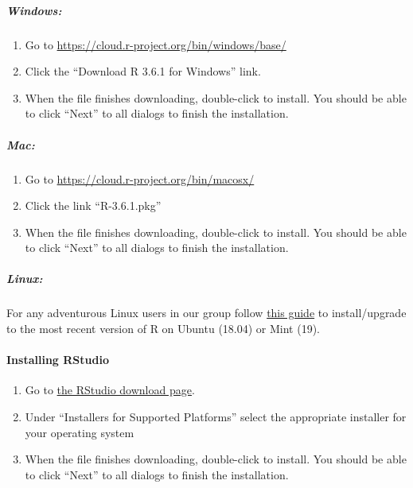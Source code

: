 \documentclass[]{article}
\providecommand{\tightlist}{%
  \setlength{\itemsep}{0pt}\setlength{\parskip}{0pt}}
\let\oldparagraph\paragraph
\renewcommand{\paragraph}[1]{\oldparagraph{#1}\mbox{}}
\let\oldsubparagraph\subparagraph
\renewcommand{\subparagraph}[1]{\oldsubparagraph{#1}\mbox{}}
\begin{document}
\hypertarget{windows}{%
\subparagraph{Windows:}\label{windows}}

\begin{enumerate}
\def\labelenumi{\arabic{enumi}.}
\tightlist
\item
  Go to \url{https://cloud.r-project.org/bin/windows/base/}
\item
  Click the ``Download R 3.6.1 for Windows'' link.
\item
  When the file finishes downloading, double-click to install. You
  should be able to click ``Next'' to all dialogs to finish the
  installation.
\end{enumerate}

\hypertarget{mac}{%
\subparagraph{Mac:}\label{mac}}

\begin{enumerate}
\def\labelenumi{\arabic{enumi}.}
\tightlist
\item
  Go to \url{https://cloud.r-project.org/bin/macosx/}
\item
  Click the link ``R-3.6.1.pkg''
\item
  When the file finishes downloading, double-click to install. You
  should be able to click ``Next'' to all dialogs to finish the
  installation.
\end{enumerate}

\hypertarget{linux}{%
\subparagraph{Linux:}\label{linux}}

For any adventurous Linux users in our group follow
\href{https://github.com/duckmayr/install-update-r-on-linux}{this guide}
to install/upgrade to the most recent version of R on Ubuntu (18.04) or
Mint (19).

\hypertarget{installing-rstudio}{%
\paragraph{Installing RStudio}\label{installing-rstudio}}

\begin{enumerate}
\def\labelenumi{\arabic{enumi}.}
\tightlist
\item
  Go to
  \href{https://www.rstudio.com/products/rstudio/download/\#download}{the
  RStudio download page}.
\item
  Under ``Installers for Supported Platforms'' select the appropriate
  installer for your operating system
\item
  When the file finishes downloading, double-click to install. You
  should be able to click ``Next'' to all dialogs to finish the
  installation.
\end{enumerate}
\end{document}
